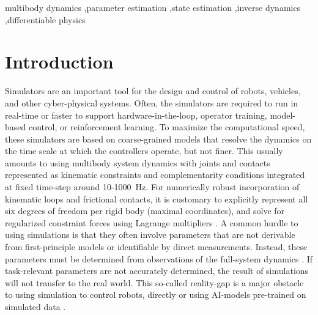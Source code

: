 \documentclass[preprint,12pt]{elsarticle}
\numberwithin{equation}{section}
\begin{document}
\begin{frontmatter}
    
    \begin{keyword}
    multibody dynamics \sep parameter estimation \sep state estimation \sep inverse dynamics \sep differentiable physics
    \end{keyword}
    
    \end{frontmatter}

\section{Introduction}
\label{sec:introduction}
Simulators are an important tool for the design and control of robots, vehicles, and other cyber-physical systems.
Often, the simulators are required to run in real-time or faster to support hardware-in-the-loop, operator training, model-based control, or reinforcement learning.
To maximize the computational speed, these simulators are based on coarse-grained models that resolve the dynamics on the time scale at which the controllers operate, but not finer.
This usually amounts to using multibody system dynamics with joints and contacts represented as kinematic constraints and complementarity conditions \cite{baraff1996linear,stewart1996implicit} integrated at fixed time-step around 10-\SI{1000}{Hz}.
For numerically robust incorporation of kinematic loops and frictional contacts, it is customary to explicitly represent all six degrees of freedom per rigid body (maximal coordinates), and solve for regularized constraint forces using Lagrange multipliers \cite{lacoursiere2007ghosts}.
A common hurdle to using simulations is that they often involve parameters that are not derivable from first-principle models or identifiable by direct measurements.
Instead, these parameters must be determined from observations of the full-system dynamics \cite{lee2023robot}.
If task-relevant parameters are not accurately determined, the result of simulations will not transfer to the real world.
This so-called reality-gap is a major obstacle to using simulation to control robots, directly or using AI-models pre-trained on simulated data \cite{choi2021use}.
\end{document}
